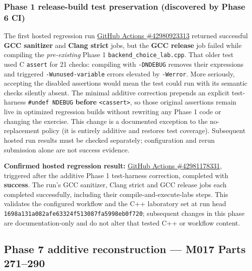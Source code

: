 \subsubsection{Phase 1 release-build test preservation (discovered by Phase 6 CI)}\label{appendix-a103e7846d21-phase-1-release-build-test-preservation-discovered-by-phase-6-ci}

\hypertarget{appendix-a103e7846d21-phase-1-release-build-test-preservation-discovered-by-phase-6-ci}{}

The first hosted regression run \href{https://github.com/swayam8624/Project_008_AllMight/actions/runs/42980923313}{GitHub Actions \#42980923313} returned successful \textbf{GCC sanitizer} and \textbf{Clang strict} jobs, but the \textbf{GCC release} job failed while compiling the \emph{pre-existing} Phase 1 \texttt{backend\_choice\_lab.cpp}. That older test used C \texttt{assert} for 21 checks: compiling with \texttt{-DNDEBUG} removes their expressions and triggered \texttt{-Wunused-variable} errors elevated by \texttt{-Werror}. More seriously, accepting the disabled assertions would mean the test could run with its semantic checks silently absent. The minimal additive correction prepends an explicit test-harness \texttt{\#undef\ NDEBUG} \textbf{before} \texttt{\textless{}cassert\textgreater{}}, so those original assertions remain live in optimized regression builds without rewriting any Phase 1 code or changing the exercise. This change is a documented exception to the no-replacement policy (it is entirely additive and restores test coverage). Subsequent hosted run results must be checked separately; configuration and rerun submission alone are not success evidence.

\textbf{Confirmed hosted regression result:} \href{https://github.com/swayam8624/Project_008_AllMight/actions/runs/42981178331}{GitHub Actions \#42981178331}, triggered after the additive Phase 1 test-harness correction, completed with \textbf{success}. The run's GCC sanitizer, Clang strict and GCC release jobs each completed successfully, including their compile-and-execute-labs steps. This validates the configured workflow and the C++ laboratory set at run head \texttt{1698a131a082afe63324f513087fa5998eb0f720}; subsequent changes in this phase are documentation-only and do not alter that tested C++ or workflow content.

\subsection{Phase 7 additive reconstruction --- M017 Parts 271--290}\label{appendix-a103e7846d21-phase-7-additive-reconstruction-m017-parts-271290}

